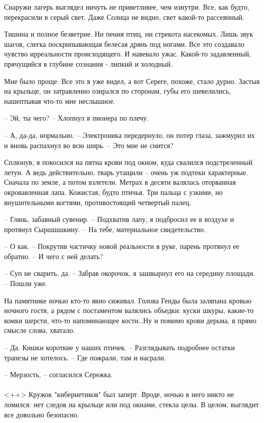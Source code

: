 \documentclass[a4paper]{book}
\begin{document}
Снаружи лагерь выглядел ничуть не приветливее, чем изнутри. Все, как будто, перекрасили в серый свет. Даже Солнца не видно, свет какой-то рассеянный. 

Тишина и полное безветрие. Ни пения птиц, ни стрекота насекомых. Лишь звук шагов, слегка поскрипывающая белесая дрянь под ногами. Все это создавало чувство ирреальности происходящего. И навевало ужас. Какой-то задавленный, прячущийся в глубине сознания - липкий и холодный. 

Мне было проще. Все это я уже видел, а вот Сереге, похоже, стало дурно. Застыв на крыльце, он затравленно озирался по сторонам, губы его шевелились, нашептывая что-то мне неслышное.

-- Эй, ты чего? -- Хлопнул я пионера по плечу.

-- А, да-да, нормально. -- Электроника передернуло, он потер глаза, зажмурил их и вновь распахнул во всю ширь. -- Это мне не снится?

Сплюнув, я покосился на пятна крови под окном, куда свалился подстреленный летун. А ведь действительно, тварь утащили -- очень уж подтеки характерные. Сначала по земле, а потом взлетели. Метрах в десяти валялась оторванная окровавленная лапа. Кожистая, будто птичья. Три пальца с узкими, но внушительными когтями, противостоящий четвертый палец.

-- Глянь, забавный сувенир. -- Подхватив лапу, я подбросил ее в воздухе и протянул Сыршшшкину. -- На тебе, материальное свидетельство. 

-- О как. -- Покрутив частичку новой реальности в руке, парень протянул ее обратно. -- И чего с ней делать?

-- Суп не сварить, да. -- Забрав окорочок, я зашвырнул его на середину площади. -- Пошли уже. 

На памятнике ночью кто-то явно сиживал. Голова Генды была заляпана кровью ночного гостя, а рядом с постаментом валялись объедки: куски шкуры, какие-то комки шерсти, что-то напоминающее кости\ldots Ну и помимо крови дерьма, в прямо смысле слова, хватало.

-- Да. Кишки короткие у наших птичек. -- Разглядывать подробнее остатки трапезы не хотелось. -- Где пожрали, там и насрали.

-- Мерзость, -- согласился Сережка.

\paragraph{}<++>
Кружок "кибернетиков" был заперт. Вроде, ночью в него никто не ломился: нет следов на крыльце или под окнами, стекла целы. В целом, выглядит все довольно безопасно. 
\end{document}
